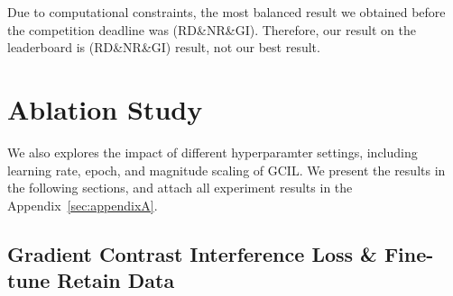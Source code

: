 \documentclass[11pt]{article}
\begin{document}

Due to computational constraints, the most balanced result we obtained before the competition deadline was (RD\&NR\&GI). Therefore, our result on the leaderboard is (RD\&NR\&GI) result, not our best result.



\section{Ablation Study}
\label{sec:Ablation}


We also explores the impact of different hyperparamter settings, including learning rate, epoch, and magnitude scaling of GCIL. We present the results in the following sections, and attach all experiment results in the Appendix~\ref{sec:appendixA}.
\iffalse
\subsection{Gradient Contrast Interference Loss \& Fine-tune Retain Data} 
\end{document}

